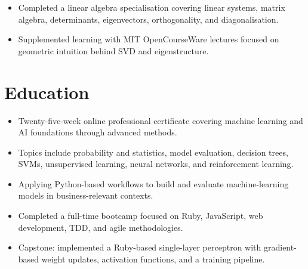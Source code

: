 \documentclass[11pt,letterpaper]{article}
\begin{document}
\begin{itemize}
  \item Completed a linear algebra specialisation covering linear systems, matrix algebra, determinants, eigenvectors, orthogonality, and diagonalisation.
  \item Supplemented learning with MIT OpenCourseWare lectures focused on geometric intuition behind SVD and eigenstructure.
\end{itemize}

\section*{Education}
\begin{itemize}
  \item Twenty-five-week online professional certificate covering machine learning and AI foundations through advanced methods.
  \item Topics include probability and statistics, model evaluation, decision trees, SVMs, unsupervised learning, neural networks, and reinforcement learning.
  \item Applying Python-based workflows to build and evaluate machine-learning models in business-relevant contexts.
\end{itemize}

\begin{itemize}
  \item Completed a full-time bootcamp focused on Ruby, JavaScript, web development, TDD, and agile methodologies.
  \item Capstone: implemented a Ruby-based single-layer perceptron with gradient-based weight updates, activation functions, and a training pipeline.
\end{itemize}

\end{document}
